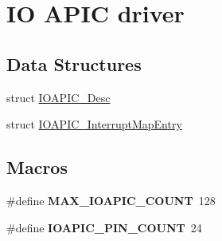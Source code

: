 \hypertarget{group__ioapic__driver}{}\section{IO A\+P\+IC driver}
\label{group__ioapic__driver}
\subsection*{Data Structures}
\begin{DoxyCompactItemize}
\item 
struct \hyperlink{structIOAPIC__Desc}{I\+O\+A\+P\+I\+C\+\_\+\+Desc}
\item 
struct \hyperlink{structIOAPIC__InterruptMapEntry}{I\+O\+A\+P\+I\+C\+\_\+\+Interrupt\+Map\+Entry}
\end{DoxyCompactItemize}
\subsection*{Macros}
\begin{DoxyCompactItemize}
\item 
\#define {\bfseries M\+A\+X\+\_\+\+I\+O\+A\+P\+I\+C\+\_\+\+C\+O\+U\+NT}~128\hypertarget{group__ioapic__driver_gaae56740375e9882b1757f0b2a39009bb}{}\label{group__ioapic__driver_gaae56740375e9882b1757f0b2a39009bb}

\item 
\#define {\bfseries I\+O\+A\+P\+I\+C\+\_\+\+P\+I\+N\+\_\+\+C\+O\+U\+NT}~24\hypertarget{group__ioapic__driver_ga082123e6ffce76dbda0b5e88929c8b57}{}\label{group__ioapic__driver_ga082123e6ffce76dbda0b5e88929c8b57}

\end{DoxyCompactItemize}
